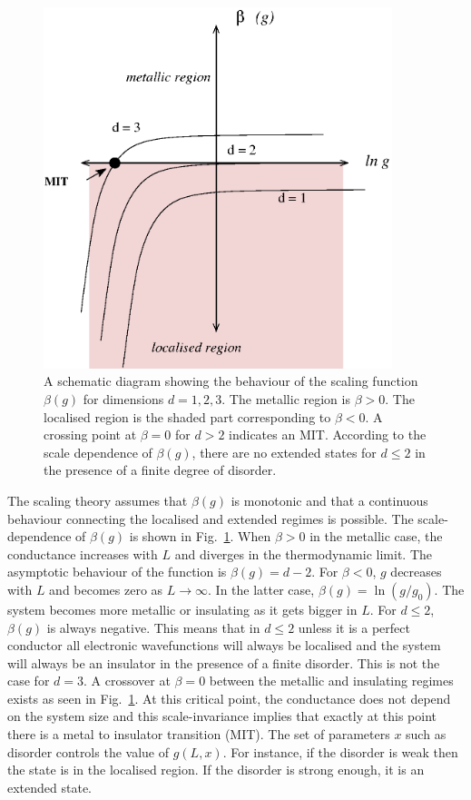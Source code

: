 \begin{figure}
  \centering
  \includegraphics[width=4.0in]{betafxn.eps}
   \caption[ A schematic diagram showing the behaviour of the scaling function $\beta(g)$ for dimensions $d=1,2,3$.]{ A schematic diagram showing the behaviour of the scaling function $\beta(g)$ for dimensions $d=1,2,3$.  The metallic region is $\beta>0$.  The localised region is the shaded part corresponding to $\beta<0$. A crossing point at $\beta=0$ for $d>2$ indicates an MIT.  According to the scale dependence of $\beta(g)$, there are no extended states for $d\leq2$ in the presence of a finite degree of disorder.}
\label{fig-betafxn}
\end{figure}

The scaling theory assumes that $\beta(g)$ is monotonic and that a continuous behaviour connecting the localised and extended regimes is possible.  The scale-dependence of $\beta(g)$ is shown in Fig.~\ref{fig-betafxn}.  When $\beta > 0$ in the metallic case, the conductance increases with $L$ and diverges in the thermodynamic limit.  The asymptotic behaviour of the function is $\beta(g)=d-2$.  For $\beta<0$, $g$ decreases with $L$ and becomes zero as $L\rightarrow\infty$.  In the latter case, $\beta(g)=\ln (g/g_0)$.  The system becomes more metallic or insulating as it gets bigger in $L$.  
For $d\leq2$, $\beta(g)$ is always negative.  This means that in $d\leq2$ unless it is a perfect conductor all electronic wavefunctions will always be localised and the system will always be an insulator in the presence of a finite disorder.
This is not the case for $d=3$.  A crossover at $\beta =0$ between the metallic and insulating regimes exists as seen in Fig.~\ref{fig-betafxn}.  At this critical point, the conductance does not depend on the system size and this scale-invariance implies that exactly at this point there is a metal to insulator transition (MIT).  The set of parameters $x$ such as disorder controls the value of $g(L,x)$.  For instance, if the disorder is weak then the state is in the localised region.  If the disorder is strong enough, it is an extended state.

